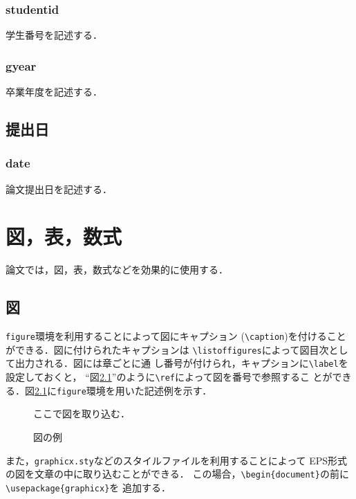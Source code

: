 \documentclass[11pt]{ujreport}
\begin{document}
\subsection{studentid}
学生番号を記述する．

\subsection{gyear}
卒業年度を記述する．

\section{提出日}
\subsection{date}
論文提出日を記述する．


\chapter{図，表，数式}\label{chap:fig-tab-exp}
論文では，図，表，数式などを効果的に使用する．

\section{図}
{\tt figure}環境を利用することによって図にキャプション
(\verb|\caption|)を付けることができる．図に付けられたキャプションは
\verb|\listoffigures|によって図目次として出力される．図には章ごとに通
し番号が付けられ，キャプションに\verb|\label|を設定しておくと，
``図\ref{fig:sample}''のように\verb|\ref|によって図を番号で参照するこ
とができる．図\ref{fig:sample}に{\tt figure}環境を用いた記述例を示す．

\begin{figure}
  \begin{center}
    ここで図を取り込む．
  \end{center}
  \caption{図の例}
  \label{fig:sample}
\end{figure}

また，{\tt graphicx.sty}などのスタイルファイルを利用することによって
EPS形式の図を文章の中に取り込むことができる．
この場合，\verb|\begin{document}|の前に\verb|\usepackage{graphicx}|を
追加する．
\end{document}
